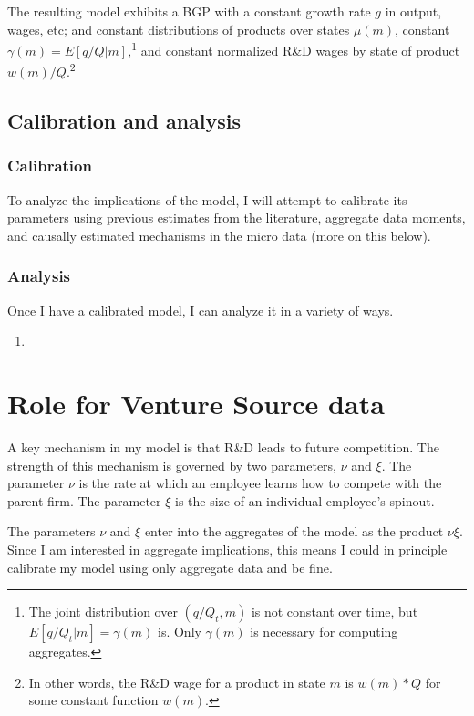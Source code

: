 \documentclass[12pt,english]{article}
\theoremstyle{remark}
\begin{document}
The resulting model exhibits a BGP with a constant growth rate $g$ in output, wages, etc; and constant distributions of products over states $\mu(m)$, constant $\gamma(m) = E[q / Q | m]$,\footnote{The joint distribution over $(q/Q_t,m)$ is not constant over time, but $E[q/Q_t | m] = \gamma(m)$ is. Only $\gamma(m)$ is necessary for computing aggregates.} and constant normalized R\&D wages by state of product $w(m) / Q$.\footnote{In other words, the R\&D wage for a product in state $m$ is $w(m) * Q$ for some constant function $w(m)$.} 

\subsection{Calibration and analysis}

\subsubsection{Calibration}

To analyze the implications of the model, I will attempt to calibrate its parameters using previous estimates from the literature, aggregate data moments, and causally estimated mechanisms in the micro data (more on this below).

\subsubsection{Analysis} 

Once I have a calibrated model, I can analyze it in a variety of ways. 
\begin{enumerate}
	\item 
\end{enumerate}


\section{Role for Venture Source data}

A key mechanism in my model is that R\&D leads to future competition. The strength of this mechanism is governed by two parameters, $\nu$ and $\xi$. The parameter $\nu$ is the rate at which an employee learns how to compete with the parent firm. The parameter $\xi$ is the size of an individual employee's spinout. 

The parameters $\nu$ and $\xi$ enter into the aggregates of the model as the product $\nu \xi$. Since I am interested in aggregate implications, this means I could in principle calibrate my model using only aggregate data and be fine.  
\end{document}
